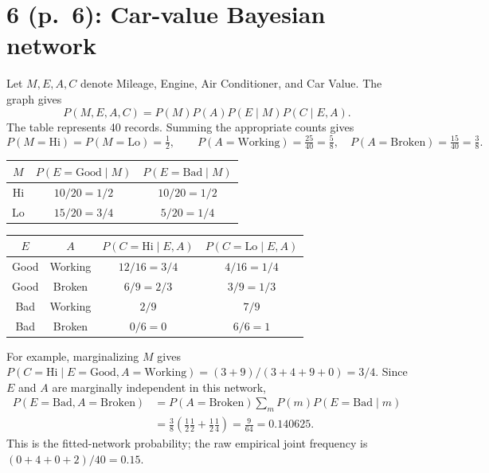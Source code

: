 \documentclass[11pt,a4paper]{article}
\begin{document}
\section*{6 (p.\ 6): Car-value Bayesian network}
Let $M,E,A,C$ denote Mileage, Engine, Air Conditioner, and Car Value.
The graph gives
\[
 \boxed{P(M,E,A,C)=P(M)P(A)P(E\mid M)P(C\mid E,A)}.
\]
The table represents 40 records. Summing the appropriate counts gives
\[
 P(M=\mathrm{Hi})=P(M=\mathrm{Lo})=\tfrac12,\qquad
 P(A=\mathrm{Working})=\tfrac{25}{40}=\tfrac58,\quad
 P(A=\mathrm{Broken})=\tfrac{15}{40}=\tfrac38.
\]
\begin{center}
\begin{tabular}{c|cc}
\toprule
$M$&$P(E=\mathrm{Good}\mid M)$&$P(E=\mathrm{Bad}\mid M)$\\
\midrule
Hi&$10/20=1/2$&$10/20=1/2$\\
Lo&$15/20=3/4$&$5/20=1/4$\\
\bottomrule
\end{tabular}
\quad
\begin{tabular}{cc|cc}
\toprule
$E$&$A$&$P(C=\mathrm{Hi}\mid E,A)$&$P(C=\mathrm{Lo}\mid E,A)$\\
\midrule
Good&Working&$12/16=3/4$&$4/16=1/4$\\
Good&Broken&$6/9=2/3$&$3/9=1/3$\\
Bad&Working&$2/9$&$7/9$\\
Bad&Broken&$0/6=0$&$6/6=1$\\
\bottomrule
\end{tabular}
\end{center}
For example, marginalizing $M$ gives $P(C=\mathrm{Hi}\mid E=\mathrm{Good},
A=\mathrm{Working})=(3+9)/(3+4+9+0)=3/4$.
Since $E$ and $A$ are marginally independent in this network,
\[
\begin{aligned}
P(E=\mathrm{Bad},A=\mathrm{Broken})
 &=P(A=\mathrm{Broken})\sum_mP(m)P(E=\mathrm{Bad}\mid m)\\
 &=\frac38\left(\frac12\frac12+\frac12\frac14\right)
 =\boxed{\frac9{64}=0.140625}.
\end{aligned}
\]
This is the fitted-network probability; the raw empirical joint frequency
is $(0+4+0+2)/40=0.15$.

\newpage
\end{document}
